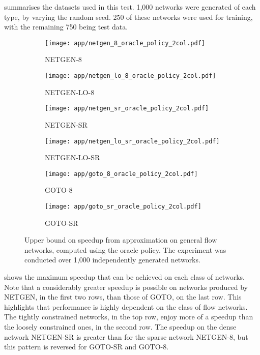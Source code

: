  summarises the datasets used in this test. 1,000 networks were generated of each type, by varying the random seed. 250 of these networks were used for training, with the remaining 750 being test data.

\begin{figure}
    \begin{widepage}
    \begin{subfigure}[c]{0.5\textwidth}
        \texttt{[image: app/netgen\_8\_oracle\_policy\_2col.pdf]}
        \caption{NETGEN-8}
    \end{subfigure}
    \begin{subfigure}[c]{0.5\textwidth}
        \texttt{[image: app/netgen\_lo\_8\_oracle\_policy\_2col.pdf]}
        \caption{NETGEN-LO-8}
    \end{subfigure}
    \begin{subfigure}[c]{0.5\textwidth}
        \texttt{[image: app/netgen\_sr\_oracle\_policy\_2col.pdf]}
        \caption{NETGEN-SR}
    \end{subfigure}
    \begin{subfigure}[c]{0.5\textwidth}
        \texttt{[image: app/netgen\_lo\_sr\_oracle\_policy\_2col.pdf]}
        \caption{NETGEN-LO-SR}
    \end{subfigure}
    \begin{subfigure}[c]{0.5\textwidth}
        \texttt{[image: app/goto\_8\_oracle\_policy\_2col.pdf]}
        \caption{GOTO-8}
    \end{subfigure}
    \begin{subfigure}[c]{0.5\textwidth}
        \texttt{[image: app/goto\_sr\_oracle\_policy\_2col.pdf]}
        \caption{GOTO-SR}
    \end{subfigure}
    \end{widepage}
    \caption[Upper bound on speedup from approximation on general flow networks]{Upper bound on speedup from approximation on general flow networks, computed using the oracle policy. The experiment was conducted over 1,000 independently generated networks.}
    \label{fig:app-general-oracle-policy}
\end{figure}

 shows the maximum speedup that can be achieved on each class of networks. Note that a considerably greater speedup is possible on networks produced by NETGEN, in the first two rows, than those of GOTO, on the last row. This highlights that performance is highly dependent on the class of flow networks. The tightly constrained networks, in the top row, enjoy more of a speedup than the loosely constrained ones, in the second row. The speedup on the dense network NETGEN-SR is greater than for the sparse network NETGEN-8, but this pattern is reversed for GOTO-SR and GOTO-8.


